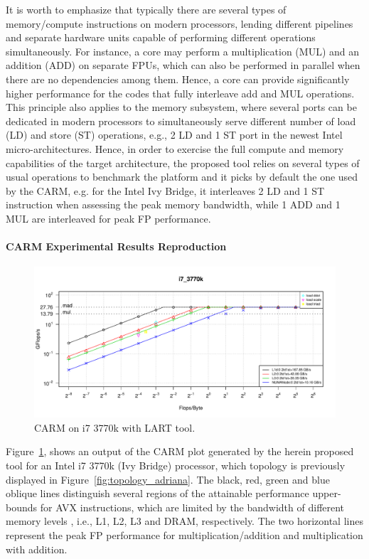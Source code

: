 \documentclass[twoside,twocolumn,8pt]{extarticle}
\begin{document}
It is worth to emphasize that typically there are several types of memory/compute instructions on modern processors, lending
different pipelines and separate hardware units capable of performing different operations simultaneously. For instance, a core
may perform a multiplication (MUL) and an addition (ADD) on separate FPUs, which  can also be performed in parallel when there are
no  dependencies among them. Hence, a core can provide significantly higher  performance for the codes that fully interleave add
and MUL operations. This principle also applies to the memory subsystem, where several ports can be dedicated in modern processors
to simultaneously serve different number of load (LD) and store (ST) operations, e.g., 2 LD and 1 ST port in the newest Intel
micro-architectures. Hence, in order to exercise the full  compute and memory capabilities of the target architecture, the proposed
tool   relies on several types of usual operations to benchmark the platform and it picks by default the one used by the CARM, e.g.
for the Intel Ivy Bridge, it interleaves 2 LD and 1 ST instruction  when assessing the peak memory bandwidth, while 1 ADD and 1 MUL
are interleaved for peak FP performance. 

\paragraph*{CARM Experimental Results Reproduction}
\begin{figure}
  \includegraphics[width=\textwidth]{pictures/roofline_model}
  \caption{CARM on i7 3770k with LART tool.}
  \label{fig:LART_adriana}
\end{figure}

Figure~\ref{fig:LART_adriana}, shows an output of the CARM plot generated by the herein proposed tool for an Intel i7
3770k (Ivy Bridge) processor, which topology is previously displayed in Figure~\ref{fig:topology_adriana}.
The black, red, green and blue oblique lines distinguish several regions of the attainable performance upper-bounds for AVX
instructions, which are limited by the bandwidth of different memory levels , i.e., L1, L2, L3 and DRAM, respectively.
The two horizontal lines represent the peak FP performance for multiplication/addition and multiplication with addition. 
\end{document}

